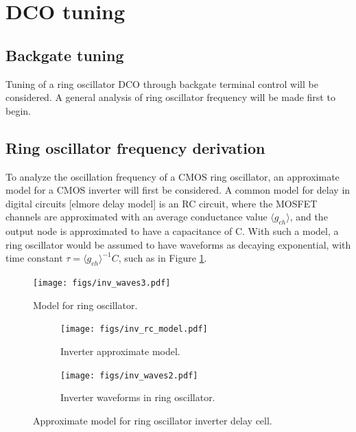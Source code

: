 	\FloatBarrier
	\flushleft
	\section{DCO tuning}
	\subsection{Backgate tuning}
		Tuning of a ring oscillator DCO through backgate terminal control will be considered. A general analysis of ring oscillator frequency will be made first to begin.

	\subsection{Ring oscillator frequency derivation}
		To analyze the oscillation frequency of a CMOS ring oscillator, an approximate model for a CMOS inverter will first be considered. A common model for delay in digital circuits [elmore delay model] is an RC circuit, where the MOSFET channels are approximated with an average conductance value $\langle g_{ch} \rangle$, and the output node is approximated to have a capacitance of C. With such a model, a ring oscillator would be assumed to have waveforms as decaying exponential, with time constant $\tau = \langle g_{ch} \rangle^{-1}C$, such as in Figure \ref{fig:rosc_rc}.
		\begin{figure}[htb!]
			\center\texttt{[image: figs/inv\_waves3.pdf]}
			\caption{Model for ring oscillator.}
			\label{fig:rosc_rc}
		\end{figure}

		\begin{figure}[htb!]
	        \centering
	        \begin{subfigure}{.5\textwidth}
	            \centering
	            \texttt{[image: figs/inv\_rc\_model.pdf]}
	            \caption{Inverter approximate model.}
	            \label{fig:rosc_3stg_cir}
	        \end{subfigure}%
	        \begin{subfigure}{.5\textwidth}
	            \centering
	            \texttt{[image: figs/inv\_waves2.pdf]}
	            \caption{Inverter waveforms in ring oscillator.}
	            \label{fig:rosc_3stg_wave}
	        \end{subfigure}
	        \caption{Approximate model for ring oscillator inverter delay cell.}
	        \label{fig:rosc_3stg}
	    \end{figure}

